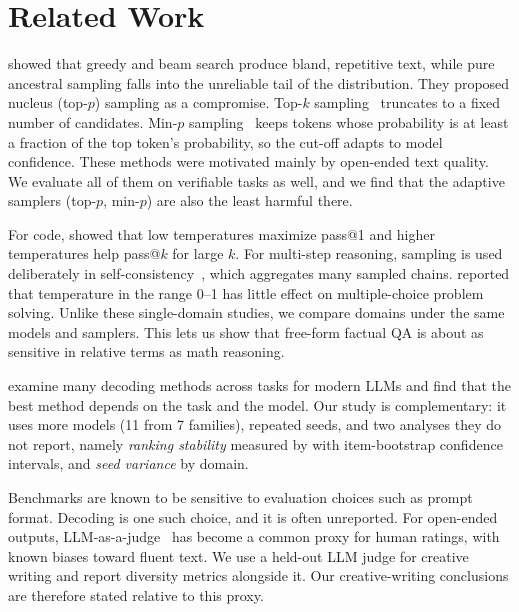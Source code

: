 \section{Related Work}
\label{sec:related}

\citet{holtzman2020curious} showed that greedy and beam search produce bland, repetitive text, while pure ancestral sampling falls into the unreliable tail of the distribution. They proposed nucleus (top-$p$) sampling as a compromise. Top-$k$ sampling~\citep{fan2018hierarchical} truncates to a fixed number of candidates. Min-$p$ sampling~\citep{nguyen2024minp} keeps tokens whose probability is at least a fraction of the top token's probability, so the cut-off adapts to model confidence. These methods were motivated mainly by open-ended text quality. We evaluate all of them on verifiable tasks as well, and we find that the adaptive samplers (top-$p$, min-$p$) are also the least harmful there.

For code, \citet{chen2021codex} showed that low temperatures maximize pass@1 and higher temperatures help pass@$k$ for large $k$. For multi-step reasoning, sampling is used deliberately in self-consistency~\citep{wang2023selfconsistency}, which aggregates many sampled chains. \citet{renze2024temperature} reported that temperature in the range 0--1 has little effect on multiple-choice problem solving. Unlike these single-domain studies, we compare domains under the same models and samplers. This lets us show that free-form factual QA is about as sensitive in relative terms as math reasoning.

\citet{shi2024thorough} examine many decoding methods across tasks for modern LLMs and find that the best method depends on the task and the model. Our study is complementary: it uses more models (11 from 7 families), repeated seeds, and two analyses they do not report, namely \emph{ranking stability} measured by \ktau with item-bootstrap confidence intervals, and \emph{seed variance} by domain.

Benchmarks are known to be sensitive to evaluation choices such as prompt format. Decoding is one such choice, and it is often unreported. For open-ended outputs, LLM-as-a-judge~\citep{zheng2023judging} has become a common proxy for human ratings, with known biases toward fluent text. We use a held-out LLM judge for creative writing and report diversity metrics alongside it. Our creative-writing conclusions are therefore stated relative to this proxy.
